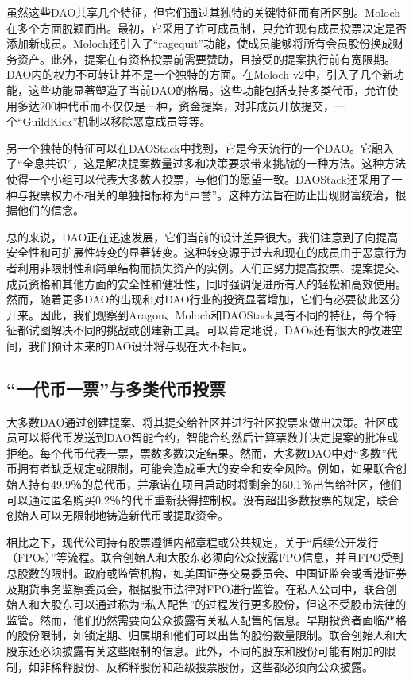 \documentclass[main.tex]{subfiles}
\begin{document}
虽然这些DAO共享几个特征，但它们通过其独特的关键特征而有所区别。Moloch在多个方面脱颖而出。最初，它采用了许可成员制，只允许现有成员投票决定是否添加新成员。Moloch还引入了“ragequit”功能，使成员能够将所有会员股份换成财务资产。此外，提案在有资格投票前需要赞助，且接受的提案执行前有宽限期。DAO内的权力不可转让并不是一个独特的方面。在Moloch v2中，引入了几个新功能，这些功能显著塑造了当前DAO的格局。这些功能包括支持多类代币，允许使用多达200种代币而不仅仅是一种，资金提案，对非成员开放提交，一个“GuildKick”机制以移除恶意成员等等。

另一个独特的特征可以在DAOStack中找到，它是今天流行的一个DAO。它融入了“全息共识”，这是解决提案数量过多和决策要求带来挑战的一种方法。这种方法使得一个小组可以代表大多数人投票，与他们的愿望一致。DAOStack还采用了一种与投票权力不相关的单独指标称为“声誉”。这种方法旨在防止出现财富统治，根据他们的信念。

总的来说，DAO正在迅速发展，它们当前的设计差异很大。我们注意到了向提高安全性和可扩展性转变的显著转变。这种转变源于过去和现在的成员由于恶意行为者利用非限制性和简单结构而损失资产的实例。人们正努力提高投票、提案提交、成员资格和其他方面的安全性和健壮性，同时强调促进所有人的轻松和高效使用。然而，随着更多DAO的出现和对DAO行业的投资显著增加，它们有必要彼此区分开来。因此，我们观察到Aragon、Moloch和DAOStack具有不同的特征，每个特征都试图解决不同的挑战或创建新工具。可以肯定地说，DAOs还有很大的改进空间，我们预计未来的DAO设计将与现在大不相同。

\subsection{``一代币一票''与多类代币投票}

大多数DAO通过创建提案、将其提交给社区并进行社区投票来做出决策。社区成员可以将代币发送到DAO智能合约，智能合约然后计算票数并决定提案的批准或拒绝。每个代币代表一票，票数多数决定结果。然而，大多数DAO中对``多数''代币拥有者缺乏规定或限制，可能会造成重大的安全和安全风险。例如，如果联合创始人持有49.9％的总代币，并承诺在项目启动时将剩余的50.1％出售给社区，他们可以通过匿名购买0.2％的代币重新获得控制权。没有超出多数投票的规定，联合创始人可以无限制地铸造新代币或提取资金。

相比之下，现代公司持有股票遵循内部章程或公共规定，关于``后续公开发行（FPOs）''等流程。联合创始人和大股东必须向公众披露FPO信息，并且FPO受到总股数的限制。政府或监管机构，如美国证券交易委员会、中国证监会或香港证券及期货事务监察委员会，根据股市法律对FPO进行监管。在私人公司中，联合创始人和大股东可以通过称为``私人配售''的过程发行更多股份，但这不受股市法律的监管。然而，他们仍然需要向公众披露有关私人配售的信息。早期投资者面临严格的股份限制，如锁定期、归属期和他们可以出售的股份数量限制。联合创始人和大股东还必须披露有关这些限制的信息。此外，不同的股东和股份可能有附加的限制，如非稀释股份、反稀释股份和超级投票股份，这些都必须向公众披露。
\end{document}
